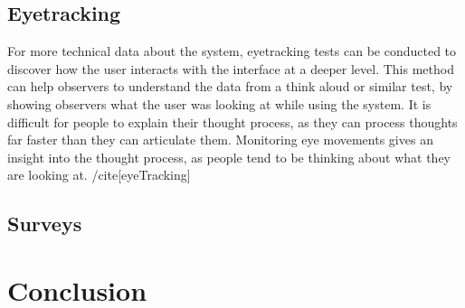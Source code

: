 \documentclass{scrartcl}
\begin{document}
\subsection{Eyetracking}
For more technical data about the system, eyetracking tests can be conducted to discover how the user interacts with the interface at a deeper level. This method can help observers to understand the data from a think aloud or similar test, by showing observers what the user was looking at while using the system. It is difficult for people to explain their thought process, as they can process thoughts far faster than they can articulate them. Monitoring eye movements gives an insight into the thought process, as people tend to be thinking about what they are looking at. /cite[eyeTracking]


\subsection{Surveys}



\section{Conclusion}





\end{document}

